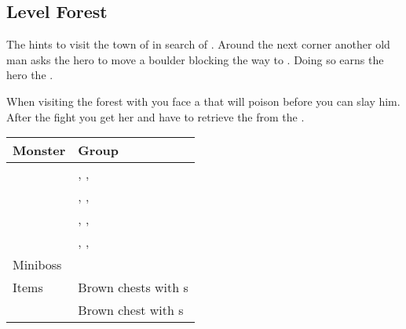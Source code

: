 \subsection{Level Forest}
\label{map:level_forest}

The  hints to visit the town of  in search of . Around the next corner another old man asks the hero to move a boulder blocking the way to . Doing so earns the hero the . 

When visiting the forest with  you face a  that will poison  before you can slay him. After the fight you get her  and have to retrieve the  from the .

\noindent\begin{tabularx}{\textwidth}[l]{lX}
	Monster & Group
\\ \hline
	\nameref{monster:brownie}
	& \nameref{monster:brownie}, \nameref{monster:brownie}, \nameref{monster:slime} \\
	& \nameref{monster:brownie}, \nameref{monster:brownie}, \nameref{monster:brownie}
\\ \hline
	\nameref{monster:slime}
	& \nameref{monster:slime}, \nameref{monster:slime}, \nameref{monster:slime} \\
	& \nameref{monster:slime}, \nameref{monster:slime}, \nameref{monster:brownie}
\\ \hline
	Miniboss & \nameref{monster:minotaur}
\\ \hline
	Items
	& Brown chests with \nameref{item:cure_potion}s \\
	& Brown chest with \nameref{item:heal_potion}s
\end{tabularx}
